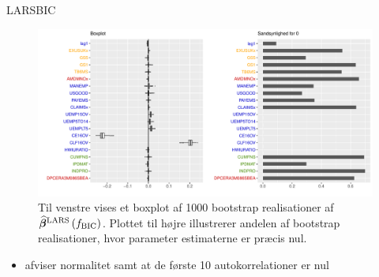 
\begin{frame}{LARS}{BIC}
\begin{figure}
 \includegraphics[width=1\linewidth, height=0.7\textheight]{slides/boxplot_lars_bic.pdf}
 \caption{Til venstre vises et boxplot af 1000 bootstrap realisationer af $\widehat{\boldsymbol{\beta}}^{\text{LARS}} \del{f_\text{BIC}} $.
Plottet til højre illustrerer andelen af bootstrap realisationer, hvor parameter estimaterne er præcis nul.}
 \end{figure}
 \begin{itemize}
\item afviser normalitet samt at de første 10 autokorrelationer er nul
\end{itemize}
\end{frame}


